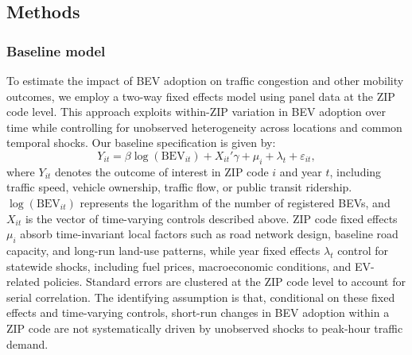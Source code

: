 \documentclass[11pt, letterpaper]{article}
\begin{document}
\subsection{Methods}
\subsubsection{Baseline model}
To estimate the impact of BEV adoption on traffic congestion and other mobility outcomes, we employ a two-way fixed effects model using panel data at the ZIP code level.
This approach exploits within-ZIP variation in BEV adoption over time while controlling for unobserved heterogeneity across locations and common temporal shocks.
Our baseline specification is given by:
\begin{equation}
Y_{it} = \beta \log(\text{BEV}_{it}) + X_{it}'\gamma + \mu_i + \lambda_t + \varepsilon_{it},
\label{eq:twfe}
\end{equation}
where $Y_{it}$ denotes the outcome of interest in ZIP code $i$ and year $t$, including traffic speed, vehicle ownership, traffic flow, or public transit ridership.
$\log(\text{BEV}_{it})$ represents the logarithm of the number of registered BEVs, and $X_{it}$ is the vector of time-varying controls described above.
ZIP code fixed effects $\mu_i$ absorb time-invariant local factors such as road network design, baseline road capacity, and long-run land-use patterns, while year fixed effects $\lambda_t$ control for statewide shocks, including fuel prices, macroeconomic conditions, and EV-related policies.
Standard errors are clustered at the ZIP code level to account for serial correlation.
The identifying assumption is that, conditional on these fixed effects and time-varying controls, short-run changes in BEV adoption within a ZIP code are not systematically driven by unobserved shocks to peak-hour traffic demand.
\end{document}
